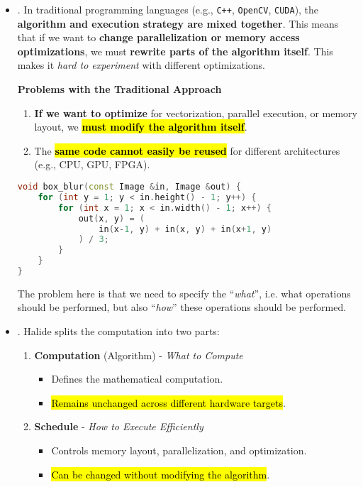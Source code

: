 \begin{itemize}
   \item {}. In traditional programming languages (e.g., \texttt{C++}, \texttt{OpenCV}, \texttt{CUDA}), the \textbf{algorithm and execution strategy are mixed together}. This means that if we want to \textbf{change parallelization or memory access optimizations}, we must \textbf{rewrite parts of the algorithm itself}. This makes it \emph{hard to experiment} with different optimizations.

   \begin{flushleft}
      \textcolor{Red2}{ \textbf{Problems with the Traditional Approach}}
   \end{flushleft}
   \begin{enumerate}
      \item \textbf{If we want to optimize} for vectorization, parallel execution, or memory layout, we \textbf{\hl{must modify the algorithm itself}}.
      \item The \textbf{\hl{same code cannot easily be reused}} for different architectures (e.g., CPU, GPU, FPGA).
   \end{enumerate}

   \begin{examplebox}
      \begin{lstlisting}[language=c++]
void box_blur(const Image &in, Image &out) {
    for (int y = 1; y < in.height() - 1; y++) {
        for (int x = 1; x < in.width() - 1; x++) {
            out(x, y) = (
                in(x-1, y) + in(x, y) + in(x+1, y)
            ) / 3;
        }
    }
}\end{lstlisting}
      The problem here is that we need to specify the ``\emph{what}'', i.e. what operations should be performed, but also ``\emph{how}'' these operations should be performed.
   \end{examplebox}


   \item {}. Halide splits the computation into two parts:
   \begin{enumerate}
      \item \textbf{Computation} (Algorithm) - \emph{What to Compute}
      \begin{itemize}
         \item Defines the mathematical computation.
         \item \hl{Remains unchanged across different hardware targets}.
      \end{itemize}
      \item \textbf{Schedule} - \emph{How to Execute Efficiently}
      \begin{itemize}
         \item Controls memory layout, parallelization, and optimization.
         \item \hl{Can be changed without modifying the algorithm}.
      \end{itemize}
   \end{enumerate}


\end{itemize}
